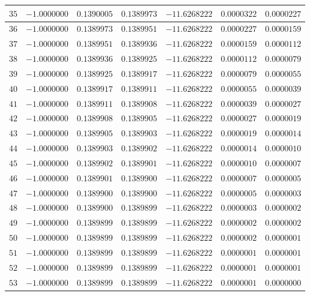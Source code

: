 \begin{center}
\begin{longtable}{|c|c|c|c|c|c|c|}
		$35$ & $-1.0000000$ & $0.1390005$ & $0.1389973$ & $-11.6268222$ & $0.0000322$ & $0.0000227$ \\ \hline
		$36$ & $-1.0000000$ & $0.1389973$ & $0.1389951$ & $-11.6268222$ & $0.0000227$ & $0.0000159$ \\ \hline
		$37$ & $-1.0000000$ & $0.1389951$ & $0.1389936$ & $-11.6268222$ & $0.0000159$ & $0.0000112$ \\ \hline
		$38$ & $-1.0000000$ & $0.1389936$ & $0.1389925$ & $-11.6268222$ & $0.0000112$ & $0.0000079$ \\ \hline
		$39$ & $-1.0000000$ & $0.1389925$ & $0.1389917$ & $-11.6268222$ & $0.0000079$ & $0.0000055$ \\ \hline
		$40$ & $-1.0000000$ & $0.1389917$ & $0.1389911$ & $-11.6268222$ & $0.0000055$ & $0.0000039$ \\ \hline
		$41$ & $-1.0000000$ & $0.1389911$ & $0.1389908$ & $-11.6268222$ & $0.0000039$ & $0.0000027$ \\ \hline
		$42$ & $-1.0000000$ & $0.1389908$ & $0.1389905$ & $-11.6268222$ & $0.0000027$ & $0.0000019$ \\ \hline
		$43$ & $-1.0000000$ & $0.1389905$ & $0.1389903$ & $-11.6268222$ & $0.0000019$ & $0.0000014$ \\ \hline
		$44$ & $-1.0000000$ & $0.1389903$ & $0.1389902$ & $-11.6268222$ & $0.0000014$ & $0.0000010$ \\ \hline
		$45$ & $-1.0000000$ & $0.1389902$ & $0.1389901$ & $-11.6268222$ & $0.0000010$ & $0.0000007$ \\ \hline
		$46$ & $-1.0000000$ & $0.1389901$ & $0.1389900$ & $-11.6268222$ & $0.0000007$ & $0.0000005$ \\ \hline
		$47$ & $-1.0000000$ & $0.1389900$ & $0.1389900$ & $-11.6268222$ & $0.0000005$ & $0.0000003$ \\ \hline
		$48$ & $-1.0000000$ & $0.1389900$ & $0.1389899$ & $-11.6268222$ & $0.0000003$ & $0.0000002$ \\ \hline
		$49$ & $-1.0000000$ & $0.1389899$ & $0.1389899$ & $-11.6268222$ & $0.0000002$ & $0.0000002$ \\ \hline
		$50$ & $-1.0000000$ & $0.1389899$ & $0.1389899$ & $-11.6268222$ & $0.0000002$ & $0.0000001$ \\ \hline
		$51$ & $-1.0000000$ & $0.1389899$ & $0.1389899$ & $-11.6268222$ & $0.0000001$ & $0.0000001$ \\ \hline
		$52$ & $-1.0000000$ & $0.1389899$ & $0.1389899$ & $-11.6268222$ & $0.0000001$ & $0.0000001$ \\ \hline
		$53$ & $-1.0000000$ & $0.1389899$ & $0.1389899$ & $-11.6268222$ & $0.0000001$ & $0.0000000$ \\ \hline

\end{longtable}
\end{center}
